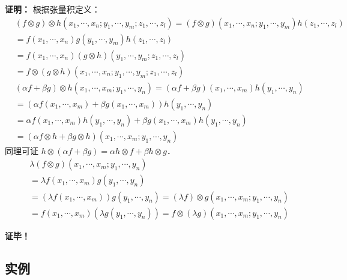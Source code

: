 \textbf{证明：}
根据张量积定义：
\begin{equation}
\begin{aligned}
&(f\otimes g)\otimes h(x_1,\cdots,x_n;y_1,\cdots,y_m;z_1,\cdots,z_l)=(f\otimes g)(x_1,\cdots,x_n;y_1,\cdots,y_m)h(z_1,\cdots,z_l)\\
&=f(x_1,\cdots,x_n)g(y_1,\cdots,y_m)h(z_1,\cdots,z_l)\\
&=f(x_1,\cdots,x_n)(g\otimes h)(y_1,\cdots,y_m;z_1,\cdots,z_l)\\
&=f\otimes(g\otimes h)(x_1,\cdots,x_n;y_1,\cdots,y_m;z_1,\cdots,z_l)
\end{aligned}
\end{equation}
\begin{equation}
\begin{aligned}
&(\alpha f+\beta g)\otimes h(x_1,\cdots,x_m;y_1,\cdots,y_n)=(\alpha f+\beta g)(x_1,\cdots,x_m)h(y_1,\cdots,y_n)\\
&=(\alpha f(x_1,\cdots,x_m)+\beta g(x_1,\cdots,x_m))h(y_1,\cdots,y_n)\\
&=\alpha f(x_1,\cdots,x_m)h(y_1,\cdots,y_n)+\beta g(x_1,\cdots,x_m)h(y_1,\cdots,y_n)\\
&=(\alpha f\otimes h+\beta g\otimes h)(x_1,\cdots,x_m;y_1,\cdots,y_n)
\end{aligned}
\end{equation}
同理可证 $h\otimes(\alpha f+\beta g)=\alpha h\otimes f+\beta h\otimes g$．
\begin{equation}
\begin{aligned}
&\lambda (f\otimes g)(x_1,\cdots,x_m;y_1,\cdots,y_n)\\
&=\lambda f(x_1,\cdots,x_m)g(y_1,\cdots,y_n)\\
&=(\lambda f(x_1,\cdots,x_m))g(y_1,\cdots,y_n)=(\lambda f)\otimes g(x_1,\cdots,x_m;y_1,\cdots,y_n)\\
&= f(x_1,\cdots,x_m)(\lambda g(y_1,\cdots,y_n))=f\otimes(\lambda g)(x_1,\cdots,x_m;y_1,\cdots,y_n)
\end{aligned}
\end{equation}

\textbf{证毕！}
\subsection{实例}

